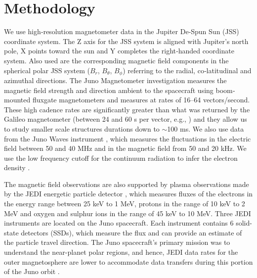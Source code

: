 \section{Methodology}
We use high‐resolution magnetometer data in the Jupiter De‐Spun Sun (JSS) coordinate system. The Z axis for the JSS system is aligned with Jupiter's north pole, X points toward the sun and Y completes the right‐handed coordinate system. Also used are the corresponding magnetic field components in the spherical polar JSS system ($B_r$, $B_\theta$, $B_\phi$) referring to the radial, co‐latitudinal and azimuthal directions. The Juno Magnetometer investigation measures the magnetic field strength and direction ambient to the spacecraft using boom‐mounted fluxgate magnetometers \cite{Connerney2017TheInvestigation} and measures at rates of 16–64 vectors/second. These high cadence rates are significantly greater than what was returned by the Galileo magnetometer (between 24 and 60 s per vector, e.g., ) and they allow us to study smaller scale structures durations down to $\sim$100 ms. We also use data from the Juno Waves instrument \cite{Kurth2017TheInvestigation}, which measures the fluctuations in the electric field between 50 and 40 MHz and in the magnetic field from 50 and 20 kHz. We use the low frequency cutoff for the continuum radiation to infer the electron density \cite{Barnhart2009ElectronSpectra}. 

The magnetic field observations are also supported by plasma observations made by the JEDI energetic particle detector \cite{Mauk2017TheMission}, which measures fluxes of the electrons in the energy range between 25 keV to 1 MeV, protons in the range of 10 keV to 2 MeV and oxygen and sulphur ions in the range of 45 keV to 10 MeV. Three JEDI instruments are located on the Juno spacecraft. Each instrument contains 6 solid-state detectors (SSDs), which measure the flux and can provide an estimate of the particle travel direction. The Juno spacecraft's primary mission was to understand the near-planet polar regions, and hence, JEDI data rates for the outer magnetosphere are lower to accommodate data transfers during this portion of the Juno orbit \cite{Mauk2017TheMission}.  

